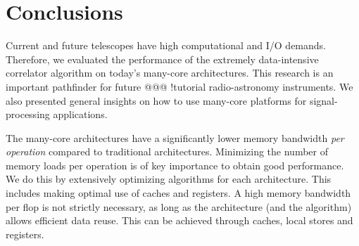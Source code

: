 \documentclass{article}
\newcommand{\longversion}[1]{}
\begin{document}
\longversion{
\section{Aplying the techniques: a case study with the Intel Larrabee}

Intel recently disclosed some details about the upcoming Larrabee processor,
a fully programmable GPU based on the well-known x86 instruction set.
Although performance details are unknown, it is interesting to compare the
Larrabee to the aforementioned architectures, and to see how a correlator
should be implemented to obtain optimal performance.

The processing power comes from Larrabee's relatively long vector size:
a vector holds 16~elements, where the other architectures have vectors lengths
of at most~4.
The long vector size forces us to reconsider our parallelization strategy.
There are several options to perform 16~simultaneous FMAs.
One option is to operate on 16~samples with consecutive time stamps.
A minor drawback is that the data must be ``horizontally'' added to integrate,
but this can be done outside the main loop.
Another option is to operate on samples from 16~consecutive frequencies.

Another option is to correlate samples from different receivers as illustrated
by Figure~\ref{fig-correlation}.
This method minimizes memory loads, but requires additional shuffling of data.
Unfortunately, the most efficient method can only be determined empirically,
when the hardware is available.
} %

\section{Conclusions}
\label{conclusions}
Current and future telescopes have high computational and I/O demands.
Therefore, we evaluated the performance of the extremely
data-intensive correlator algorithm on today's many-core
architectures. This research is an important pathfinder for future @@@ !tutorial
radio-astronomy instruments. We also presented general insights on how to use many-core
platforms for signal-processing applications.

The many-core architectures have a significantly lower memory
bandwidth \emph{per operation} compared to traditional architectures.
Minimizing the number of memory loads per operation is of key
importance to obtain good performance.  We do this by extensively optimizing algorithms for each
architecture.  This includes making optimal use of caches and
registers.  A high memory bandwidth per flop is not strictly
necessary, as long as the architecture (and the algorithm) allows efficient data reuse.
This can be achieved through caches, local stores and registers.
\end{document}

